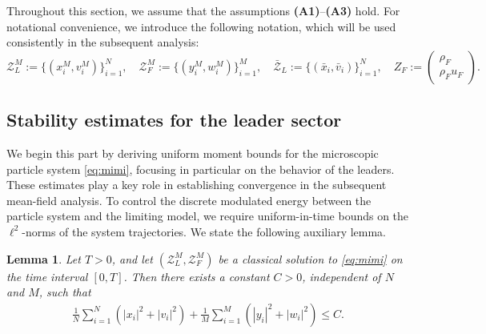 \documentclass[10pt, reqno]{amsart}
\newtheorem{lemma}[theorem]{Lemma}
\theoremstyle{definition}
\theoremstyle{remark}
\numberwithin{equation}{section}
\newcommand{\calZ}{\mathcal Z}
\newcommand{\bp}{\begin{pmatrix}}
\newcommand{\ep}{\end{pmatrix}}
\begin{document}
Throughout this section, we assume that the assumptions {\bf (A1)}--{\bf (A3)} hold. For notational convenience, we introduce the following notation, which will be used consistently in the subsequent analysis:
 \begin{equation*}
 \mathcal{Z}^M_L := \{(x_i^M, v_i^M)\}_{i=1}^N, \quad \mathcal{Z}^M_F := \{(y_i^M, w_i^M)\}_{i=1}^M,
\quad
  \bar{\mathcal{Z}}_L := \{(\bar x_i, \bar v_i)\}_{i=1}^N, \quad Z_F := \bp \rho_F \\ \rho_F u_F \ep.
 \end{equation*}
%
%
%
%
%
%
%
%
%
%
%
%
%
%
\subsection{Stability estimates for the leader sector}
We begin this part by deriving uniform moment bounds for the microscopic particle system \eqref{eq:mimi}, focusing in particular on the behavior of the leaders. These estimates play a key role in establishing convergence in the subsequent mean-field analysis. To control the discrete modulated energy between the particle system and the limiting model, we require uniform-in-time bounds on the $\ell^2$-norms of the system trajectories. We state the following auxiliary lemma.
\begin{lemma} \label{lem: l2 bdd}
Let $T>0$, and let $(\calZ^M_L, \calZ^M_F)$ be a classical solution to \eqref{eq:mimi} on the time interval $[0,T]$. Then there exists a constant $C>0$, independent of $N$ and $M$, such that
    \begin{align*}
        \frac{1}{N}\sum_{i=1}^N (|x_i|^2 + |v_i|^2) + \frac{1}{M}\sum_{i=1}^M (|y_i|^2+|w_i|^2) \le C.
    \end{align*}
\end{lemma}
\end{document}
